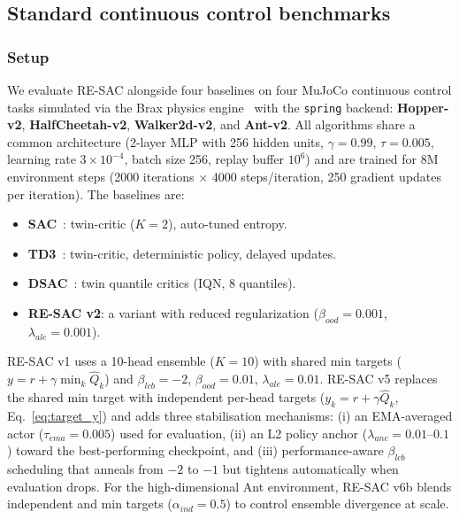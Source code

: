 \documentclass[10pt]{article}
\begin{document}
\subsection{Standard continuous control benchmarks}
\label{sec:mujoco}

\subsubsection{Setup}
We evaluate RE-SAC alongside four baselines on four MuJoCo continuous control tasks simulated via the Brax physics engine~\cite{Freeman2021Brax} with the \texttt{spring} backend: \textbf{Hopper-v2}, \textbf{HalfCheetah-v2}, \textbf{Walker2d-v2}, and \textbf{Ant-v2}. All algorithms share a common architecture (2-layer MLP with 256 hidden units, $\gamma = 0.99$, $\tau = 0.005$, learning rate $3 \times 10^{-4}$, batch size 256, replay buffer $10^6$) and are trained for 8M environment steps (2000 iterations $\times$ 4000 steps/iteration, 250 gradient updates per iteration). The baselines are:
\begin{itemize}[leftmargin=*,itemsep=1pt]
    \item \textbf{SAC}~\cite{Haarnoja2018SAC}: twin-critic ($K{=}2$), auto-tuned entropy.
    \item \textbf{TD3}~\cite{Fujimoto2018TD3}: twin-critic, deterministic policy, delayed updates.
    \item \textbf{DSAC}~\cite{Ma2025DSAC}: twin quantile critics (IQN, 8 quantiles).
    \item \textbf{RE-SAC v2}: a variant with reduced regularization ($\beta_{ood}{=}0.001$, $\lambda_{ale}{=}0.001$).
\end{itemize}
RE-SAC v1 uses a 10-head ensemble ($K{=}10$) with shared min targets ($y = r + \gamma \min_k \hat Q_k$) and $\beta_{lcb}{=}{-2}$, $\beta_{ood}{=}0.01$, $\lambda_{ale}{=}0.01$.
RE-SAC v5 replaces the shared min target with independent per-head targets ($y_k = r + \gamma \hat Q_k$, Eq.~\eqref{eq:target_y}) and adds three stabilisation mechanisms: (i) an EMA-averaged actor ($\tau_{ema}{=}0.005$) used for evaluation, (ii) an L2 policy anchor ($\lambda_{anc}{=}0.01$--$0.1$) toward the best-performing checkpoint, and (iii) performance-aware $\beta_{lcb}$ scheduling that anneals from $-2$ to $-1$ but tightens automatically when evaluation drops.
For the high-dimensional Ant environment, RE-SAC v6b blends independent and min targets ($\alpha_{ind}{=}0.5$) to control ensemble divergence at scale.
\end{document}

